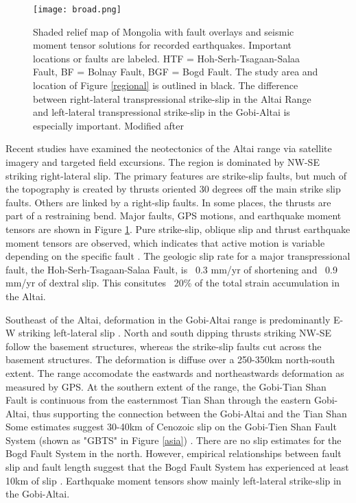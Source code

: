 \begin{figure}[h!]
	\centering
	\texttt{[image: broad.png]}
	\caption{Shaded relief map of Mongolia with fault overlays and seismic moment tensor solutions for recorded earthquakes. Important locations or faults are labeled. HTF = Hoh-Serh-Tsagaan-Salaa Fault, BF = Bolnay Fault, BGF = Bogd Fault. The study area and location of Figure \ref{regional} is outlined in black. The difference between right-lateral transpressional strike-slip in the Altai Range and left-lateral transpressional strike-slip in the Gobi-Altai is especially important. Modified after \citet{Calais2003}}
	\label{broad}
\end{figure}

	Recent studies have examined the neotectonics of the Altai range via satellite imagery and targeted field excursions\citep{Cunningham2005a}. The region is dominated by NW-SE striking right-lateral slip. The primary features are strike-slip faults, but much of the topography is created by thrusts oriented 30 degrees off the main strike slip faults. Others are linked by a right-slip faults. In some places, the thrusts are part of a restraining bend. Major faults, GPS motions, and earthquake moment tensors are shown in Figure \ref{broad}. Pure strike-slip, oblique slip and thrust earthquake moment tensors are observed, which indicates that active motion is variable depending on the specific fault \citep{Bayasgalan2005a}. The geologic slip rate for a major transpressional fault, the Hoh-Serh-Tsagaan-Salaa Fault, is ~0.3 mm/yr of shortening and ~0.9 mm/yr of dextral slip. This consitutes ~20\% of the total strain accumulation in the Altai. \citep{Frankel2010}

	Southeast of the Altai, deformation in the Gobi-Altai range is predominantly E-W striking left-lateral slip \citep{Cunningham2010}. North and south dipping thrusts striking NW-SE follow the basement structures, whereas the strike-slip faults cut across the basement structures. The deformation is diffuse over a 250-350km north-south extent. The range accomodate the eastwards and northeastwards deformation as measured by GPS. At the southern extent of the range, the Gobi-Tian Shan Fault is continuous from the easternmost Tian Shan through the eastern Gobi-Altai, thus supporting the connection between the Gobi-Altai and the Tian Shan Some estimates suggest 30-40km of Cenozoic slip on the Gobi-Tien Shan Fault System (shown as "GBTS" in Figure \ref{asia}) \citep{Cunningham2003a}. There are no slip estimates for the Bogd Fault System in the north. However, empirical relationships between fault slip and fault length suggest that the Bogd Fault System has experienced at least 10km of slip \citep{Cowie1992}.  Earthquake moment tensors show mainly left-lateral strike-slip in the Gobi-Altai. 

